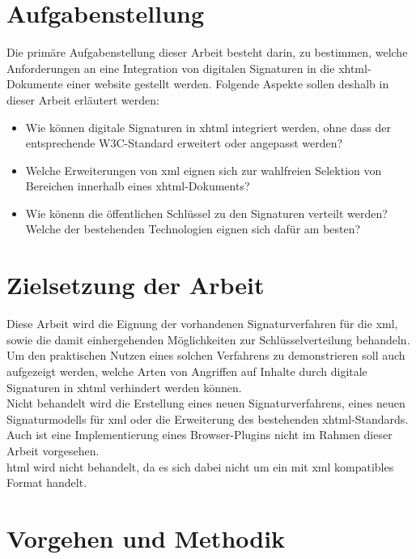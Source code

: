 \section{Aufgabenstellung}
%
\label{sec:Einleitung:aufgabenstellung}
Die primäre Aufgabenstellung dieser Arbeit besteht darin, zu bestimmen, welche Anforderungen an eine Integration von digitalen Signaturen in die
\gls{xhtml}-Dokumente einer \gls{website} gestellt werden. Folgende Aspekte sollen deshalb in dieser Arbeit erläutert werden:
\begin{itemize}
    \item Wie können digitale Signaturen in \gls{xhtml} integriert werden, ohne dass der entsprechende W3C-Standard\cite{xhtml:w3c} erweitert oder angepasst
    werden?
    \item Welche Erweiterungen von \gls{xml} eignen sich zur wahlfreien Selektion von Bereichen innerhalb eines \gls{xhtml}-Dokuments?
    \item Wie könenn die öffentlichen Schlüssel zu den Signaturen verteilt werden? Welche der bestehenden Technologien eignen sich dafür am besten?
\end{itemize}

\section{Zielsetzung der Arbeit}
\label{sec:Einleitung:ziele}
Diese Arbeit wird die Eignung der vorhandenen Signaturverfahren für die \gls{xml}, sowie die damit einhergehenden Möglichkeiten zur Schlüsselverteilung
behandeln. Um den praktischen Nutzen eines solchen Verfahrens zu demonstrieren soll auch aufgezeigt werden, welche Arten von Angriffen auf Inhalte durch
digitale Signaturen in \gls{xhtml} verhindert werden können.\\

Nicht behandelt wird die Erstellung eines neuen Signaturverfahrens, eines neuen Signaturmodells für \gls{xml} oder die Erweiterung des bestehenden
\gls{xhtml}-Standards. Auch ist eine Implementierung eines Browser-Plugins nicht im Rahmen dieser Arbeit vorgesehen.\\
\gls{html} wird nicht behandelt, da es sich dabei nicht um ein mit \gls{xml} kompatibles Format handelt.

\section{Vorgehen und Methodik}
\label{sec:Einleitung:methodik}


